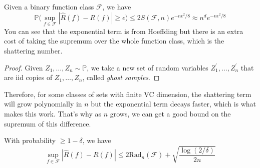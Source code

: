   \begin{theorem}[VC Theorem]
    Given a binary function class $\mathcal{F}$, we have
    \begin{equation}
      \mathbb{P} \bigg( \sup_{f \in \mathcal{F}} | \hat{R} (f) - R(f) | \geq \epsilon \bigg) \leq 2 S(\mathcal{F}, n) e^{-n \epsilon^2 / 8} \approx n^d e^{-n \epsilon^2 / 8}
    \end{equation}
    You can see that the exponential term is from Hoeffding but there is an extra cost of taking the supremum over the whole function class, which is the shattering number.
  \end{theorem}
  \begin{proof}
    Given $Z_1, \ldots, Z_n \sim \mathbb{P}$, we take a new set of random variables $Z_1^\prime, \ldots, Z_n^\prime$ that are iid copies of $Z_1, \ldots, Z_n$, called \textit{ghost samples}. 
  \end{proof}

  Therefore, for some classes of sets with finite VC dimension, the shattering term will grow polynomially in $n$ but the exponential term decays faster, which is what makes this work. That's why as $n$ grows, we can get a good bound on the supremum of this difference. 

  \begin{theorem}
    With probability $\geq 1 - \delta$, we have 
    \begin{equation}
      \sup_{f \in \mathcal{F}} | \hat{R} (f) - R(f) | \leq 2 \mathrm{Rad}_n (\mathcal{F}) + \sqrt{\frac{\log (2 / \delta)}{2 n}}
    \end{equation}
  \end{theorem}

